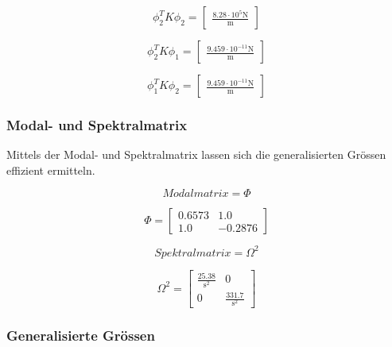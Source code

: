 \documentclass[
  letterpaper,
  DIV=11]{scrreprt}
\begin{document}
\begin{equation}\phi_{2}^{T} K \phi_{2} = \left[\begin{matrix}\frac{8.28 \cdot 10^{5} \text{N}}{\text{m}}\end{matrix}\right]\end{equation}

\begin{equation}\phi_{2}^{T} K \phi_{1} = \left[\begin{matrix}\frac{9.459 \cdot 10^{-11} \text{N}}{\text{m}}\end{matrix}\right]\end{equation}

\begin{equation}\phi_{1}^{T} K \phi_{2} = \left[\begin{matrix}\frac{9.459 \cdot 10^{-11} \text{N}}{\text{m}}\end{matrix}\right]\end{equation}

\hypertarget{modal--und-spektralmatrix-3}{%
\subsubsection{Modal- und
Spektralmatrix}\label{modal--und-spektralmatrix-3}}

Mittels der Modal- und Spektralmatrix lassen sich die generalisierten
Grössen effizient ermitteln.

\begin{equation}Modalmatrix = \Phi\end{equation}

\begin{equation}\Phi = \left[\begin{matrix}0.6573 & 1.0\\1.0 & -0.2876\end{matrix}\right]\end{equation}

\begin{equation}Spektralmatrix = \Omega^{2}\end{equation}

\begin{equation}\Omega^{2} = \left[\begin{matrix}\frac{25.38}{\text{s}^{2}} & 0\\0 & \frac{331.7}{\text{s}^{2}}\end{matrix}\right]\end{equation}

\hypertarget{generalisierte-gruxf6ssen-3}{%
\subsubsection{Generalisierte
Grössen}\label{generalisierte-gruxf6ssen-3}}
\end{document}
